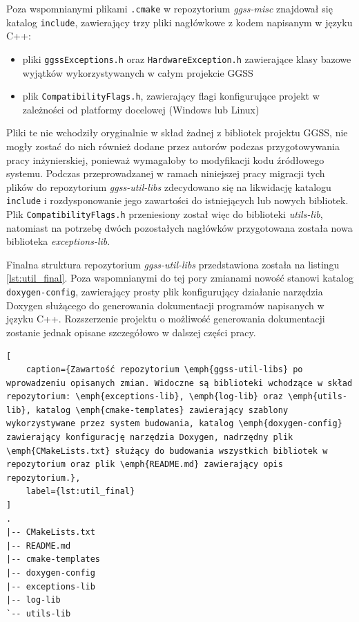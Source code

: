 Poza wspomnianymi plikami \lstinline{.cmake} w repozytorium \emph{ggss-misc} znajdował się katalog \lstinline{include}, zawierający trzy pliki nagłówkowe z kodem napisanym w języku C++:
\begin{itemize}
    \item pliki \lstinline{ggssExceptions.h} oraz \lstinline{HardwareException.h} zawierające klasy bazowe wyjątków wykorzystywanych w całym projekcie GGSS
    \item plik \lstinline{CompatibilityFlags.h}, zawierający flagi konfigurujące projekt w zależności od platformy docelowej (Windows lub Linux)
\end{itemize}
Pliki te nie wchodziły oryginalnie w skład żadnej z bibliotek projektu GGSS, nie mogły zostać do nich również dodane przez autorów podczas przygotowywania pracy inżynierskiej, ponieważ wymagałoby to modyfikacji kodu źródłowego systemu. Podczas przeprowadzanej w ramach niniejszej pracy migracji tych plików do repozytorium \emph{ggss-util-libs} zdecydowano się na likwidację katalogu \lstinline{include} i rozdysponowanie jego zawartości do istniejących lub nowych bibliotek. Plik \lstinline{CompatibilityFlags.h} przeniesiony został więc do biblioteki \emph{utils-lib}, natomiast na potrzebę dwóch pozostałych nagłówków przygotowana została nowa biblioteka \emph{exceptions-lib}.

Finalna struktura repozytorium \emph{ggss-util-libs} przedstawiona została na listingu \ref{lst:util_final}. Poza wspomnianymi do tej pory zmianami nowość stanowi katalog \lstinline{doxygen-config}, zawierający prosty plik konfigurujący działanie narzędzia Doxygen służącego do generowania dokumentacji programów napisanych w języku C++. Rozszerzenie projektu o możliwość generowania dokumentacji zostanie jednak opisane szczegółowo w dalszej części pracy.

\begin{lstlisting}[
    caption={Zawartość repozytorium \emph{ggss-util-libs} po wprowadzeniu opisanych zmian. Widoczne są biblioteki wchodzące w skład repozytorium: \emph{exceptions-lib}, \emph{log-lib} oraz \emph{utils-lib}, katalog \emph{cmake-templates} zawierający szablony wykorzystywane przez system budowania, katalog \emph{doxygen-config} zawierający konfigurację narzędzia Doxygen, nadrzędny plik \emph{CMakeLists.txt} służący do budowania wszystkich bibliotek w repozytorium oraz plik \emph{README.md} zawierający opis repozytorium.},
    label={lst:util_final}
]
.
|-- CMakeLists.txt
|-- README.md
|-- cmake-templates
|-- doxygen-config
|-- exceptions-lib
|-- log-lib
`-- utils-lib
\end{lstlisting}

